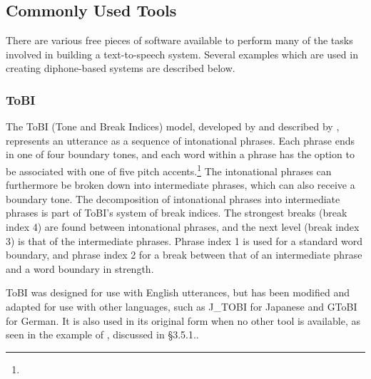 \documentclass[12pt]{article}
\begin{document}
	\subsection{Commonly Used Tools}

	There are various free pieces of software available to perform many of the tasks involved in building a text-to-speech system. Several examples which are used in creating diphone-based systems are described below. \par

		\subsubsection{ToBI}
		The ToBI (Tone and Break Indices) model, developed by \citet{tobi} and described by \citet{slp}, represents an utterance as a sequence of intonational phrases. Each phrase ends in one of four boundary tones, and each word within a phrase has the option to be associated with one of five pitch accents.\footnote{} The intonational phrases can furthermore be broken down into intermediate phrases, which can also receive a boundary tone. The decomposition of intonational phrases into intermediate phrases is part of ToBI's system of break indices. The strongest breaks (break index 4) are found between intonational phrases, and the next level (break index 3) is that of the intermediate phrases. Phrase index 1 is used for a standard word boundary, and phrase index 2 for a break between that of an intermediate phrase and a word boundary in strength. \par

		ToBI was designed for use with English utterances, but has been modified and adapted for use with other languages, such as J\_TOBI for Japanese and GToBI for German. It is also used in its original form when no other tool is available, as seen in the example of \citet{mongolian}, discussed in \S 3.5.1.. \par
\end{document}
